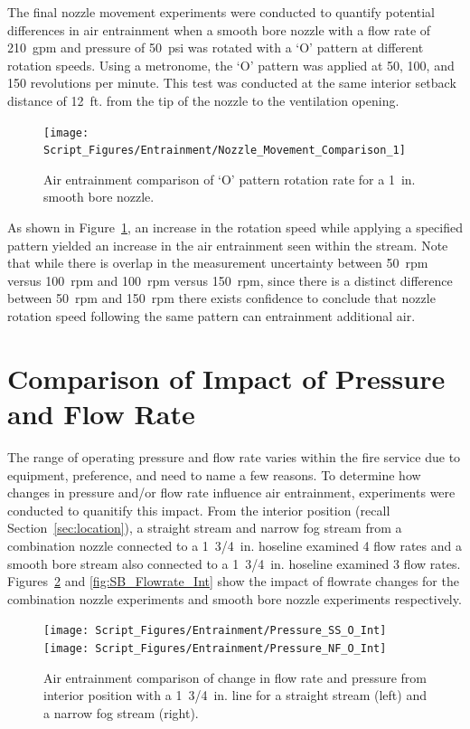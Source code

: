 \documentclass[12pt,oneside]{book}
\begin{document}
The final nozzle movement experiments were conducted to quantify potential differences in air entrainment when a smooth bore nozzle with a flow rate of 210~gpm and pressure of 50~psi was rotated with a `O' pattern at different rotation speeds. Using a metronome, the `O' pattern was applied at 50, 100, and 150 revolutions per minute. This test was conducted at the same interior setback distance of 12~ft. from the tip of the nozzle to the ventilation opening.

\begin{figure}[!ht]
\centering
\texttt{[image: Script\_Figures/Entrainment/Nozzle\_Movement\_Comparison\_1]}
\caption[Air Entrainment Comparison of Pattern Rotation Rate]{Air entrainment comparison of `O' pattern rotation rate for a 1~in. smooth bore nozzle.}
\label{fig:Nozzle_Movement_RotationSpeed_Comparison}
\end{figure}

As shown in Figure~\ref{fig:Nozzle_Movement_RotationSpeed_Comparison}, an increase in the rotation speed while applying a specified pattern yielded an increase in the air entrainment seen within the stream. Note that while there is overlap in the measurement uncertainty between 50~rpm versus 100~rpm and 100~rpm versus 150~rpm, since there is a distinct difference between 50~rpm and 150~rpm there exists confidence to conclude that nozzle rotation speed following the same pattern can entrainment additional air.

\section{Comparison of Impact of Pressure and Flow Rate}

The range of operating pressure and flow rate varies within the fire service due to equipment, preference, and need to name a few reasons. To determine how changes in pressure and/or flow rate influence air entrainment, experiments were conducted to quanitify this impact. From the interior position (recall Section~\ref{sec:location}), a straight stream and narrow fog stream from a combination nozzle connected to a 1~3/4~in. hoseline examined 4 flow rates and a smooth bore stream also connected to a 1~3/4~in. hoseline examined 3 flow rates. Figures~\ref{fig:SS_NF_FlowRate_Int} and \ref{fig:SB_Flowrate_Int} show the impact of flowrate changes for the combination nozzle experiments and smooth bore nozzle experiments respectively.

\begin{figure}[!ht]
\centering
\texttt{[image: Script\_Figures/Entrainment/Pressure\_SS\_O\_Int]}
\texttt{[image: Script\_Figures/Entrainment/Pressure\_NF\_O\_Int]}
\caption[Air Entrainment Comparison of Pressure and Flow Rate for Interior Combination Nozzle from 1~3/4~in. Line]{Air entrainment comparison of change in flow rate and pressure from interior position with a 1~3/4~in. line for a straight stream (left) and a narrow fog stream (right).}
\label{fig:SS_NF_FlowRate_Int}
\end{figure}
\end{document}
